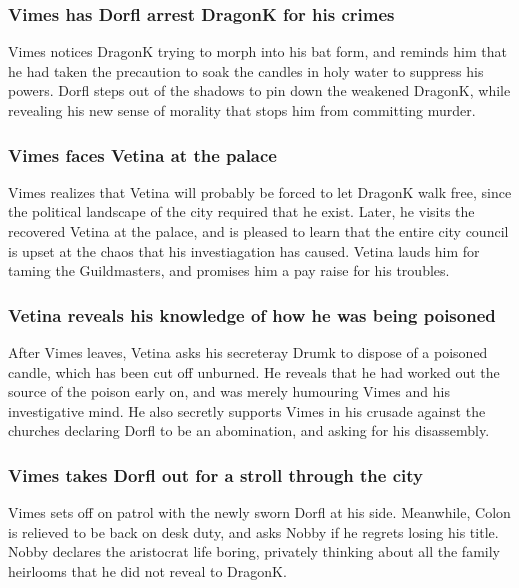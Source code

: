 \subsubsection{\Gls{Vimes} has \Gls{Dorfl} arrest \Gls{DragonK} for his crimes}
\Gls{Vimes} notices \Gls{DragonK} trying to morph into his bat form, and reminds him that he had
taken the precaution to soak the candles in holy water to suppress his powers. \Gls{Dorfl} steps
out of the shadows to pin down the weakened \Gls{DragonK}, while revealing his new sense of morality
that stops him from committing murder.

\subsubsection{\Gls{Vimes} faces \Gls{Vetina} at the palace}
\Gls{Vimes} realizes that \Gls{Vetina} will probably be forced to let \Gls{DragonK} walk free, since
the political landscape of the city required that he exist. Later, he visits the recovered
\Gls{Vetina} at the palace, and is pleased to learn that the entire city council is upset at the
chaos that his investiagation has caused. \Gls{Vetina} lauds him for taming the Guildmasters,
and promises him a pay raise for his troubles.

\subsubsection{\Gls{Vetina} reveals his knowledge of how he was being poisoned}
After \Gls{Vimes} leaves, \Gls{Vetina} asks his secreteray \Gls{Drumk} to dispose of a poisoned
candle, which has been cut off unburned. He reveals that he had worked out the source of the poison
early on, and was merely humouring \Gls{Vimes} and his investigative mind. He also secretly
supports \Gls{Vimes} in his crusade against the churches declaring \Gls{Dorfl} to be an abomination,
and asking for his disassembly.

\subsubsection{\Gls{Vimes} takes \Gls{Dorfl} out for a stroll through the city}
\Gls{Vimes} sets off on patrol with the newly sworn \Gls{Dorfl} at his side. Meanwhile, \Gls{Colon}
is relieved to be back on desk duty, and asks \Gls{Nobby} if he regrets losing his title.
\Gls{Nobby} declares the aristocrat life boring, privately thinking about all the family heirlooms
that he did not reveal to \Gls{DragonK}.

